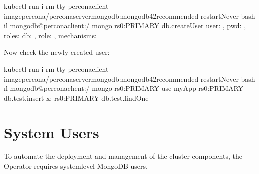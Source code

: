 \documentclass[letterpaper,10pt,english]{sphinxmanual}
\begin{document}
\begin{sphinxVerbatim}[commandchars=\\\{\}]
\PYGZdl{} kubectl run \PYGZhy{}i \PYGZhy{}\PYGZhy{}rm \PYGZhy{}\PYGZhy{}tty percona\PYGZhy{}client \PYGZhy{}\PYGZhy{}imagepercona/percona\PYGZhy{}server\PYGZhy{}mongodb:mongodb42recommended \PYGZhy{}\PYGZhy{}restartNever \PYGZhy{}\PYGZhy{} bash \PYGZhy{}il
mongodb@percona\PYGZhy{}client:/\PYGZdl{} mongo 
rs0:PRIMARY\PYGZgt{} db.createUser
    user: ,
    pwd: ,
    roles: \PYG{o}{[}
       db: , role:  
    \PYG{o}{]},
    mechanisms: \PYG{o}{[}
    \PYG{o}{]}

\end{sphinxVerbatim}

Now check the newly created user:

\begin{sphinxVerbatim}[commandchars=\\\{\}]
\PYGZdl{} kubectl run \PYGZhy{}i \PYGZhy{}\PYGZhy{}rm \PYGZhy{}\PYGZhy{}tty percona\PYGZhy{}client \PYGZhy{}\PYGZhy{}imagepercona/percona\PYGZhy{}server\PYGZhy{}mongodb:mongodb42recommended \PYGZhy{}\PYGZhy{}restartNever \PYGZhy{}\PYGZhy{} bash \PYGZhy{}il
mongodb@percona\PYGZhy{}client:/\PYGZdl{} mongo 
rs0:PRIMARY\PYGZgt{} use myApp
rs0:PRIMARY\PYGZgt{} db.test.insert x:  
rs0:PRIMARY\PYGZgt{} db.test.findOne
\end{sphinxVerbatim}


\section{System Users}
\label{\detokenize{users:users-system-users}}\label{\detokenize{users:id3}}
To automate the deployment and management of the cluster components,
the Operator requires system\sphinxhyphen{}level MongoDB users.
\end{document}
